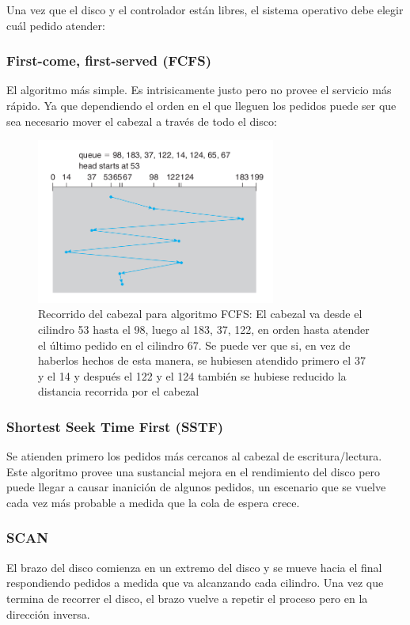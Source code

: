 Una vez que el disco y el controlador están libres, el sistema operativo debe elegir cuál pedido atender:

\subsubsection{First-come, first-served (FCFS)}
El algoritmo más simple. Es intrisicamente justo pero no provee el servicio más rápido. Ya que dependiendo el orden en el que lleguen los pedidos puede ser que sea necesario mover el cabezal a través de todo el disco:

\begin{figure}[h]
	\centering
	\includegraphics[width=0.7\textwidth]{imagenes/disco-fcfs}
	\caption{Recorrido del cabezal para algoritmo FCFS: El cabezal va desde el cilindro 53 hasta el 98, luego al 183, 37, 122, en orden hasta atender el último pedido en el cilindro 67. Se puede ver que si, en vez de haberlos hechos de esta manera, se hubiesen atendido primero el 37 y el 14 y después el 122 y el 124 también se hubiese reducido la distancia recorrida por el cabezal}
	\label{fig:disco-fcfs}
\end{figure}


\subsubsection{Shortest Seek Time First (SSTF)}
Se atienden primero los pedidos más cercanos al cabezal de escritura/lectura. 
Este algoritmo provee una sustancial mejora en el rendimiento del disco pero puede llegar a causar inanición de algunos pedidos, un escenario que se vuelve cada vez más probable a medida que la cola de espera crece.

\subsubsection{SCAN}
El brazo del disco comienza en un extremo del disco y se mueve hacia el final respondiendo pedidos a medida que va alcanzando cada cilindro. Una vez que termina de recorrer el disco, el brazo vuelve a repetir el proceso pero en la dirección inversa.

